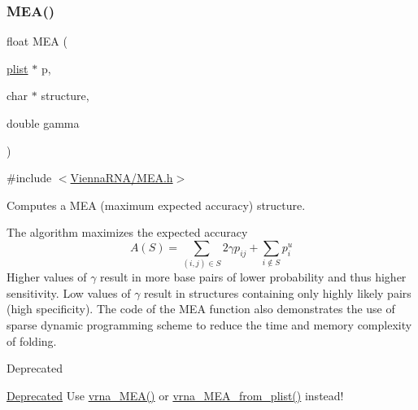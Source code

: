 \subsubsection{\texorpdfstring{MEA()}{MEA()}}
{\footnotesize\ttfamily float M\+EA (\begin{DoxyParamCaption}\item[{\mbox{\hyperlink{group__data__structures_ga9608eed021ebfbdd7a901cfdc446c8e9}{plist}} $\ast$}]{p,  }\item[{char $\ast$}]{structure,  }\item[{double}]{gamma }\end{DoxyParamCaption})}



{\ttfamily \#include $<$\mbox{\hyperlink{MEA_8h}{Vienna\+R\+N\+A/\+M\+E\+A.\+h}}$>$}



Computes a M\+EA (maximum expected accuracy) structure. 

The algorithm maximizes the expected accuracy \[ A(S) = \sum_{(i,j) \in S} 2 \gamma p_{ij} + \sum_{i \notin S} p^u_i \] Higher values of $\gamma$ result in more base pairs of lower probability and thus higher sensitivity. Low values of $\gamma$ result in structures containing only highly likely pairs (high specificity). The code of the M\+EA function also demonstrates the use of sparse dynamic programming scheme to reduce the time and memory complexity of folding.

\begin{DoxyRefDesc}{Deprecated}
\item[\mbox{\hyperlink{deprecated__deprecated000089}{Deprecated}}]Use \mbox{\hyperlink{group__mea__fold_ga9b87b664ef014c1266aa50d5bc39f2ac}{vrna\+\_\+\+M\+E\+A()}} or \mbox{\hyperlink{group__mea__fold_ga26afeef667f7013a743d1d1ebe42666a}{vrna\+\_\+\+M\+E\+A\+\_\+from\+\_\+plist()}} instead! \end{DoxyRefDesc}
